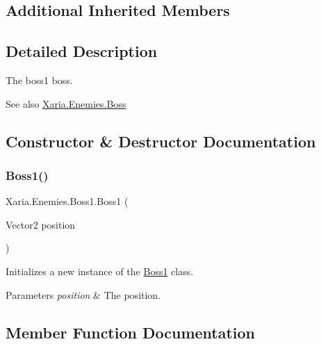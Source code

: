 \subsection*{Additional Inherited Members}


\subsection{Detailed Description}
The boss1 boss. 

\begin{DoxySeeAlso}{See also}
\hyperlink{classXaria_1_1Enemies_1_1Boss}{Xaria.\+Enemies.\+Boss}


\end{DoxySeeAlso}


\subsection{Constructor \& Destructor Documentation}
\mbox{\label{classXaria_1_1Enemies_1_1Boss1_a759929946aa105ff64f584b2d265db2b}} 
\subsubsection{\texorpdfstring{Boss1()}{Boss1()}}
{\footnotesize\ttfamily Xaria.\+Enemies.\+Boss1.\+Boss1 (\begin{DoxyParamCaption}\item[{Vector2}]{position }\end{DoxyParamCaption})\hspace{0.3cm}{\ttfamily [inline]}}



Initializes a new instance of the \hyperlink{classXaria_1_1Enemies_1_1Boss1}{Boss1} class. 


\begin{DoxyParams}{Parameters}
{\em position} & The position.\\
\hline
\end{DoxyParams}


\subsection{Member Function Documentation}
\mbox{\label{classXaria_1_1Enemies_1_1Boss1_a10fd351c6577ca1e85ec2396d421c313}} 
